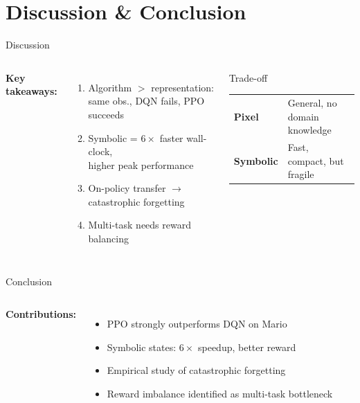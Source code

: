 \documentclass[aspectratio=169, 12pt]{beamer}
\begin{document}
\section{Discussion \& Conclusion}

\begin{frame}{Discussion}
\begin{columns}[T]
\textbf{Key takeaways:}
\begin{enumerate}
  \item Algorithm $>$ representation:\\
        same obs., DQN fails, PPO succeeds
  \item Symbolic = $6\times$ faster wall-clock,\\
        higher peak performance
  \item On-policy transfer $\to$ catastrophic forgetting
  \item Multi-task needs reward balancing
\end{enumerate}

\begin{block}{Trade-off}
\small
\begin{tabular}{p{1.5cm}p{2.8cm}}
  \toprule
  \textbf{Pixel}    & General, no domain knowledge \\
  \textbf{Symbolic} & Fast, compact, but fragile \\
  \bottomrule
\end{tabular}
\end{block}
\end{columns}
\end{frame}

\begin{frame}{Conclusion}
\begin{columns}[T]
\textbf{Contributions:}
\begin{itemize}
  \item PPO strongly outperforms DQN on Mario
  \item Symbolic states: $6\times$ speedup, better reward
  \item Empirical study of catastrophic forgetting
  \item Reward imbalance identified as multi-task bottleneck
\end{itemize}

\end{columns}
\end{frame}
\end{document}
